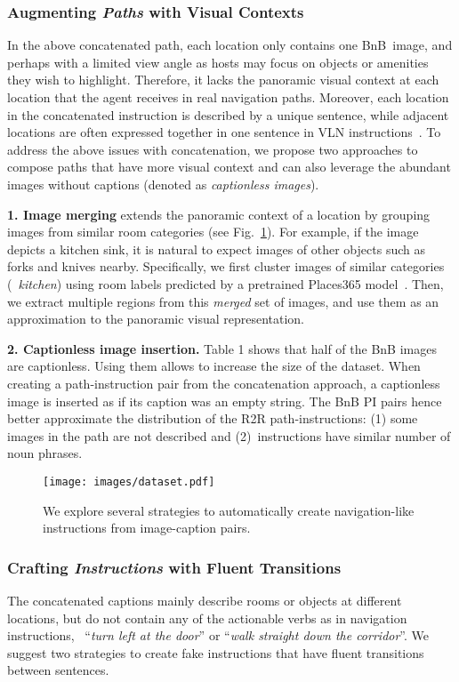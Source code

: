 \RequirePackage[dvipsnames,table]{xcolor} \documentclass[10pt,twocolumn,letterpaper]{article}
\newcommand{\p}[1]{\vspace{1mm}\noindent\textbf{#1}}
\newcommand{\airbnb}{BnB}
\begin{document}
\subsubsection{Augmenting \emph{Paths} with Visual Contexts}
In the above concatenated path, each location only contains one \airbnb~image, and perhaps with a limited view angle as hosts may focus on objects or amenities they wish to highlight.
Therefore, it lacks the panoramic visual context at each location that the agent receives in real navigation paths.
Moreover, each location in the concatenated instruction is described by a unique sentence, while adjacent locations are often expressed together in one sentence in VLN instructions~\cite{hong2020fgr2r}.
To address the above issues with concatenation, we propose two approaches to compose paths that have more visual context and can also leverage the abundant images without captions (denoted as \emph{captionless images}).

\p{1. Image merging}
extends the panoramic context of a location by grouping images from similar room categories (see Fig.~\ref{fig:dataset}).
For example, if the image depicts a kitchen sink, it is natural to expect images of other objects such as forks and knives nearby.
Specifically, we first cluster images of similar categories (\eg~\emph{kitchen}) using room labels predicted by a pretrained Places365 model~\cite{zhou2017places}.
Then, we extract multiple regions from this \emph{merged} set of images, and use them as an approximation to the panoramic visual representation.



\p{2. Captionless image insertion.}
Table 1 shows that half of the BnB images are captionless. Using them allows to increase the size of the dataset. When creating a path-instruction pair from the concatenation approach, a captionless image is inserted as if its caption was an empty string.
The BnB PI pairs hence better approximate the distribution of the R2R path-instructions: (1) some images in the path are not described
and (2)~instructions have similar number of noun phrases. 



\begin{figure}[t]
\centering
\texttt{[image: images/dataset.pdf]}
\caption{We explore several strategies to automatically create navigation-like instructions from image-caption pairs.
}
\label{fig:dataset}
\end{figure}


\subsubsection{Crafting \emph{Instructions} with Fluent Transitions}
The concatenated captions mainly describe rooms or objects at different locations, but do not contain any of the actionable verbs as in navigation instructions, \eg~``\emph{turn left at the door}'' or ``\emph{walk straight down the corridor}''.
We suggest two strategies to create fake instructions that have fluent transitions between sentences.
\end{document}
